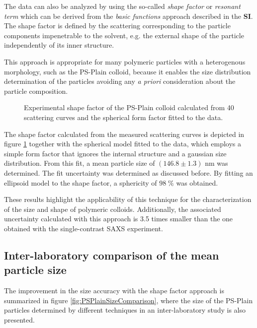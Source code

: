 The data can also be analyzed by using the so-called \emph{shape factor} or \emph{resonant term} which can be derived from the \emph{basic functions} approach\citep{stuhrmann_elimination_1965,stuhrmann_elimination_1967} described in the \textbf{SI}. The shape factor is defined by the scattering corresponding to the particle components impenetrable to the solvent, e.g. the external shape of the particle independently of its inner structure. 

This approach is appropriate for many polymeric particles with a heterogenous morphology\citep{bolze_situ_2004}, such as the PS-Plain colloid, because it enables the size distribution determination of the particles avoiding any \emph{a priori} consideration about the particle composition.

\begin{figure}
	\begin{center}
		
	\end{center}
	\caption{Experimental shape factor of the PS-Plain colloid calculated from 40 scattering curves and the spherical form factor fitted to the data.}
	\label{fig:PSPlainResonantTerm}
\end{figure}

The shape factor calculated from the measured scattering curves is depicted in figure \ref{fig:PSPlainResonantTerm} together with the spherical model fitted to the data, which employs a simple form factor that ignores the internal structure and a gaussian size distribution. From this fit, a mean particle size of $(146.8\pm1.3)$ nm was determined. The fit uncertainty was determined as discussed before. By fitting an ellipsoid model to the shape factor, a sphericity of $98\;\%$ was obtained.

These results highlight the applicability of this technique for the characterization of the size and shape of polymeric colloids. Additionally, the associated uncertainty calculated with this approach is 3.5 times smaller than the one obtained with the single-contrast SAXS experiment. 

\subsection{Inter-laboratory comparison of the mean particle size}
The improvement in the size accuracy with the shape factor approach is summarized in figure \ref{fig:PSPlainSizeComparison}, where the size of the PS-Plain particles determined by different techniques in an inter-laboratory study is also presented\citep{nicolet_inter-laboratory_2016}.


